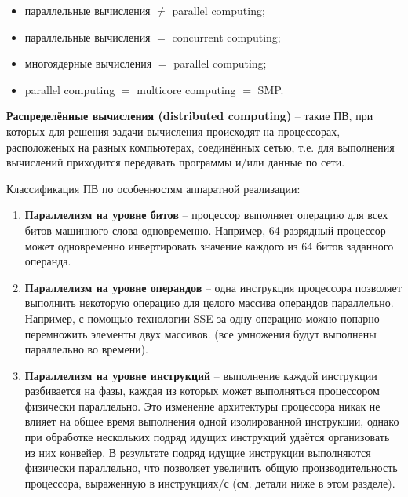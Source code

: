 \begin{itemize}
    \item параллельные вычисления $\neq$ parallel computing;			
    \item параллельные вычисления $=$ concurrent computing;
    \item многоядерные вычисления $=$ parallel computing;
    \item parallel computing $=$ multicore computing $=$ SMP.
\end{itemize}

\textbf{Распределённые вычисления (distributed computing)} -- такие ПВ, при которых для решения задачи вычисления происходят на процессорах, расположеных на разных компьютерах, соединённых сетью, т.е. для выполнения вычислений приходится передавать программы и/или данные по сети.

Классификация ПВ по особенностям аппаратной реализации:

\begin{enumerate}
    \sloppy
    \item\textbf{Параллелизм на уровне битов} -- процессор выполняет операцию для всех битов машинного слова одновременно. Например, 64-разрядный процессор может одновременно инвертировать значение каждого из 64 битов заданного операнда.
    \item\textbf{Параллелизм на уровне операндов} -- одна инструкция процессора позволяет выполнить некоторую операцию для целого массива операндов параллельно. Например, с помощью технологии SSE за одну операцию можно попарно перемножить элементы двух массивов. (все умножения будут выполнены параллельно во времени). 
    \item\textbf{Параллелизм на уровне инструкций} -- выполнение каждой инструкции разбивается на фазы, каждая из которых может выполняться процессором физически параллельно. Это изменение архитектуры процессора никак не влияет на общее время выполнения одной изолированной инструкции, однако при обработке нескольких подряд идущих инструкций удаётся организовать из них конвейер. В результате подряд идущие инструкции выполняются физически параллельно, что позволяет увеличить общую производительность процессора, выраженную в инструкциях/с (см. детали ниже в этом разделе).
\end{enumerate}


